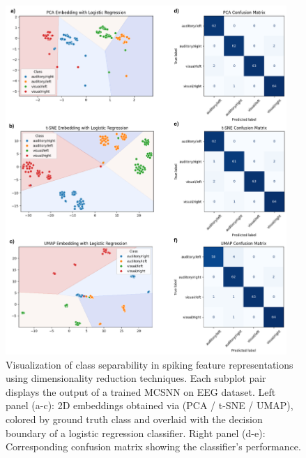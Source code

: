 \begin{figure}[htbp!]
    \centerline{\includegraphics[width=0.95\textwidth]{Chapter7/Figs/f.png}}
    \caption[Visualization of class separability in spiking feature representations using dimensionality reduction techniques.]{Visualization of class separability in spiking feature representations using dimensionality reduction techniques. Each subplot pair displays the output of a trained MCSNN on EEG dataset. Left panel (a-c): 2D embeddings obtained via (PCA / t-SNE / UMAP), colored by ground truth class and overlaid with the decision boundary of a logistic regression classifier.
    Right panel (d-e): Corresponding confusion matrix showing the classifier's performance.}
    \label{fig:7f}
\end{figure}


